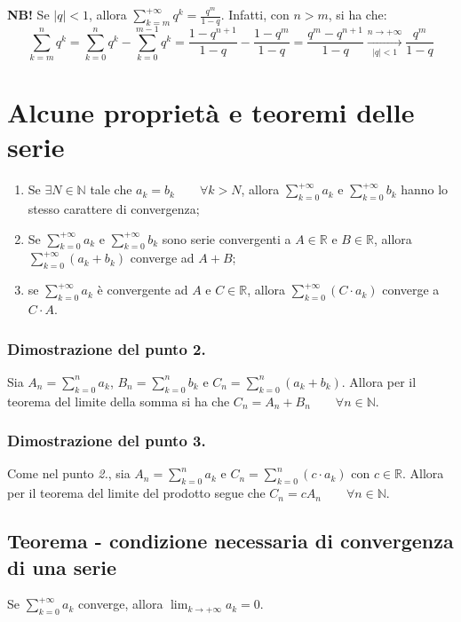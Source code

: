 \documentclass{article}
\begin{document}
\noindent\textbf{NB!} Se $|q| < 1$, allora $\sum_{k = m}^{+\infty} q^k = \frac{q^m}{1 - q}$. Infatti, con $n > m$, si ha che:
\begin{equation*}
    \sum_{k = m}^{n} q^k = \sum_{k = 0}^{n} q^k - \sum_{k = 0}^{m - 1} q^k = \frac{1 - q^{n + 1}}{1 - q} - \frac{1 - q^m}{1 - q} = \frac{q^m - q^{n + 1}}{1 - q} \overset{n \to +\infty}{\underset{|q| < 1}{\longrightarrow}} \frac{q^m}{1 - q}
\end{equation*}

\section{Alcune proprietà e teoremi delle serie}
\begin{enumerate}
    \item Se $\exists N \in \mathbb{N}$ tale che $a_k = b_k \qquad \forall k > N$, allora $\sum_{k = 0}^{+\infty} a_k$ e $\sum_{k = 0}^{+\infty} b_k$ hanno lo stesso carattere di convergenza;
    \item Se $\sum_{k = 0}^{+\infty} a_k$ e $\sum_{k = 0}^{+\infty} b_k$ sono serie convergenti a $A \in \mathbb{R}$ e $B \in \mathbb{R}$, allora $\sum_{k = 0}^{+\infty} (a_k + b_k)$ converge ad $A + B$;
    \item se $\sum_{k = 0}^{+\infty} a_k$ è convergente ad $A$ e $C \in \mathbb{R}$, allora $\sum_{k = 0}^{+\infty} (C \cdot a_k)$ converge a $C \cdot A$.
\end{enumerate}

\subsubsection{Dimostrazione del punto 2.}
Sia $A_n = \sum_{k = 0}^n a_k$, $B_n = \sum_{k = 0}^n b_k$ e $C_n = \sum_{k = 0}^n (a_k + b_k)$. Allora per il teorema del limite della somma si ha che $C_n = A_n + B_n \qquad \forall n \in \mathbb{N}$.

\subsubsection{Dimostrazione del punto 3.}
Come nel punto \textit{2.}, sia $A_n = \sum_{k = 0}^n a_k$ e $C_n = \sum_{k = 0}^n (c \cdot a_k)$ con $c \in \mathbb{R}$. Allora per il teorema del limite del prodotto segue che $C_n = c A_n \qquad \forall n \in \mathbb{N}$.

\subsection{Teorema - condizione necessaria di convergenza di una serie}
Se $\sum_{k = 0}^{+\infty} a_k$ converge, allora $\lim_{k \to +\infty} a_k = 0$.
\end{document}
